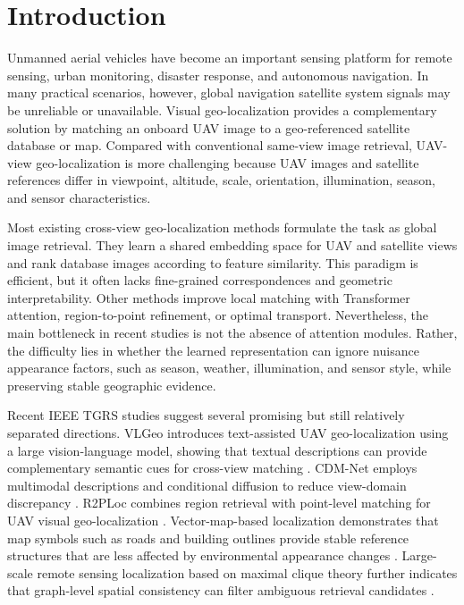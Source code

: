 \documentclass[journal]{IEEEtran}
\providecommand{\IEEEPARstart}[2]{#1#2}
\begin{document}
\section{Introduction}
\IEEEPARstart{U}{nmanned} aerial vehicles have become an important sensing platform for remote sensing, urban monitoring, disaster response, and autonomous navigation. In many practical scenarios, however, global navigation satellite system signals may be unreliable or unavailable. Visual geo-localization provides a complementary solution by matching an onboard UAV image to a geo-referenced satellite database or map. Compared with conventional same-view image retrieval, UAV-view geo-localization is more challenging because UAV images and satellite references differ in viewpoint, altitude, scale, orientation, illumination, season, and sensor characteristics.

Most existing cross-view geo-localization methods formulate the task as global image retrieval. They learn a shared embedding space for UAV and satellite views and rank database images according to feature similarity. This paradigm is efficient, but it often lacks fine-grained correspondences and geometric interpretability. Other methods improve local matching with Transformer attention, region-to-point refinement, or optimal transport. Nevertheless, the main bottleneck in recent studies is not the absence of attention modules. Rather, the difficulty lies in whether the learned representation can ignore nuisance appearance factors, such as season, weather, illumination, and sensor style, while preserving stable geographic evidence.

Recent IEEE TGRS studies suggest several promising but still relatively separated directions. VLGeo introduces text-assisted UAV geo-localization using a large vision-language model, showing that textual descriptions can provide complementary semantic cues for cross-view matching \cite{vlgeo2026}. CDM-Net employs multimodal descriptions and conditional diffusion to reduce view-domain discrepancy \cite{cdmnet2025}. R2PLoc combines region retrieval with point-level matching for UAV visual geo-localization \cite{r2ploc2025}. Vector-map-based localization demonstrates that map symbols such as roads and building outlines provide stable reference structures that are less affected by environmental appearance changes \cite{vectormap2025}. Large-scale remote sensing localization based on maximal clique theory further indicates that graph-level spatial consistency can filter ambiguous retrieval candidates \cite{rsloc820k2025}.
\end{document}
